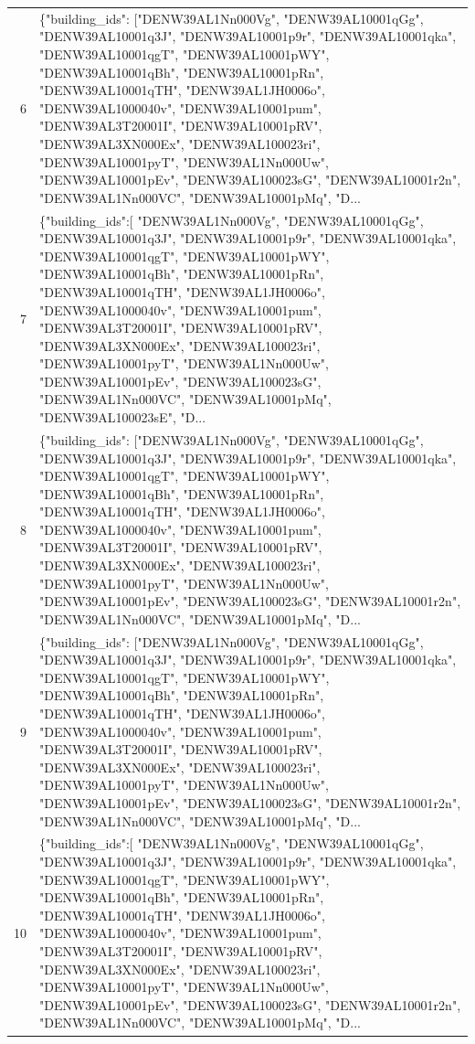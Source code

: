 \documentclass[a4paper,11pt]{article}
\begin{document}
\begin{table}[ht]
\begin{tabular}{r p{12cm}}
6 & \{"building\_ids": ["DENW39AL1Nn000Vg", "DENW39AL10001qGg", "DENW39AL10001q3J", "DENW39AL10001p9r", "DENW39AL10001qka", "DENW39AL10001qgT", "DENW39AL10001pWY", "DENW39AL10001qBh", "DENW39AL10001pRn", "DENW39AL10001qTH", "DENW39AL1JH0006o", "DENW39AL1000040v", "DENW39AL10001pum", "DENW39AL3T20001I", "DENW39AL10001pRV", "DENW39AL3XN000Ex", "DENW39AL100023ri", "DENW39AL10001pyT", "DENW39AL1Nn000Uw", "DENW39AL10001pEv", "DENW39AL100023sG", "DENW39AL10001r2n", "DENW39AL1Nn000VC", "DENW39AL10001pMq", "D... \\
7 & \{"building\_ids":[ "DENW39AL1Nn000Vg", "DENW39AL10001qGg", "DENW39AL10001q3J", "DENW39AL10001p9r", "DENW39AL10001qka", "DENW39AL10001qgT", "DENW39AL10001pWY", "DENW39AL10001qBh", "DENW39AL10001pRn", "DENW39AL10001qTH", "DENW39AL1JH0006o", "DENW39AL1000040v", "DENW39AL10001pum", "DENW39AL3T20001I", "DENW39AL10001pRV", "DENW39AL3XN000Ex", "DENW39AL100023ri", "DENW39AL10001pyT", "DENW39AL1Nn000Uw", "DENW39AL10001pEv", "DENW39AL100023sG", "DENW39AL1Nn000VC", "DENW39AL10001pMq", "DENW39AL100023sE", "D... \\
8 & \{"building\_ids": ["DENW39AL1Nn000Vg", "DENW39AL10001qGg", "DENW39AL10001q3J", "DENW39AL10001p9r", "DENW39AL10001qka", "DENW39AL10001qgT", "DENW39AL10001pWY", "DENW39AL10001qBh", "DENW39AL10001pRn", "DENW39AL10001qTH", "DENW39AL1JH0006o", "DENW39AL1000040v", "DENW39AL10001pum", "DENW39AL3T20001I", "DENW39AL10001pRV", "DENW39AL3XN000Ex", "DENW39AL100023ri", "DENW39AL10001pyT", "DENW39AL1Nn000Uw", "DENW39AL10001pEv", "DENW39AL100023sG", "DENW39AL10001r2n", "DENW39AL1Nn000VC", "DENW39AL10001pMq", "D... \\
9 & \{"building\_ids": ["DENW39AL1Nn000Vg", "DENW39AL10001qGg", "DENW39AL10001q3J", "DENW39AL10001p9r", "DENW39AL10001qka", "DENW39AL10001qgT", "DENW39AL10001pWY", "DENW39AL10001qBh", "DENW39AL10001pRn", "DENW39AL10001qTH", "DENW39AL1JH0006o", "DENW39AL1000040v", "DENW39AL10001pum", "DENW39AL3T20001I", "DENW39AL10001pRV", "DENW39AL3XN000Ex", "DENW39AL100023ri", "DENW39AL10001pyT", "DENW39AL1Nn000Uw", "DENW39AL10001pEv", "DENW39AL100023sG", "DENW39AL10001r2n", "DENW39AL1Nn000VC", "DENW39AL10001pMq", "D... \\
10 & \{"building\_ids":[ "DENW39AL1Nn000Vg", "DENW39AL10001qGg", "DENW39AL10001q3J", "DENW39AL10001p9r", "DENW39AL10001qka", "DENW39AL10001qgT", "DENW39AL10001pWY", "DENW39AL10001qBh", "DENW39AL10001pRn", "DENW39AL10001qTH", "DENW39AL1JH0006o", "DENW39AL1000040v", "DENW39AL10001pum", "DENW39AL3T20001I", "DENW39AL10001pRV", "DENW39AL3XN000Ex", "DENW39AL100023ri", "DENW39AL10001pyT", "DENW39AL1Nn000Uw", "DENW39AL10001pEv", "DENW39AL100023sG", "DENW39AL10001r2n", "DENW39AL1Nn000VC", "DENW39AL10001pMq", "D... \\

\end{tabular}
\end{table}
\end{document}
